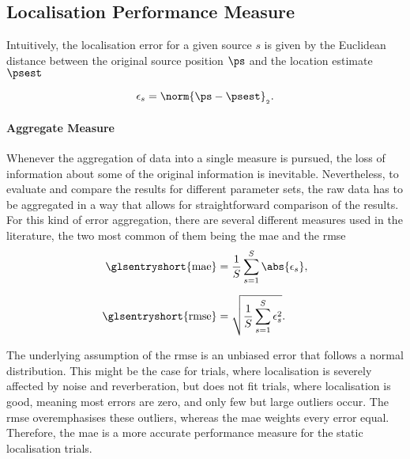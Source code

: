 \subsection{Localisation Performance Measure}
\label{sec:performanceMeasure}

Intuitively, the localisation error for a given source $s$ is given by the Euclidean distance between the original source position $\ps$ and the location estimate $\psest$

\begin{equation}
	\epsilon_s = \norm{\ps-\psest}_{_2}.
	\label{eq:error}
\end{equation}

\paragraph{Aggregate Measure} Whenever the aggregation of data into a single measure is pursued, the loss of information about some of the original information is inevitable. Nevertheless, to evaluate and compare the results for different parameter sets, the raw data has to be aggregated in a way that allows for straightforward comparison of the results. For this kind of error aggregation, there are several different measures used in the literature, the two most common of them being the \gls{mae} and the \gls{rmse}
\begin{align}
	\text{\glsentryshort{mae}}  & =\frac{1}{S}\sum_{s=1}^{S}\abs{\epsilon_s},    \\[6pt]
	\text{\glsentryshort{rmse}} & =\sqrt{\frac{1}{S}\sum_{s=1}^{S}\epsilon_s^2}.
	\label{eq:maeGeneral}
\end{align}

The underlying assumption of the \gls{rmse} is an unbiased error that follows a normal distribution. This might be the case for trials, where localisation is severely affected by noise and reverberation, but does not fit trials, where localisation is good, meaning most errors are zero, and only few but large outliers occur. The \gls{rmse} overemphasises these outliers, whereas the \gls{mae} weights every error equal. Therefore, the \gls{mae} is a more accurate performance measure for the static localisation trials.

